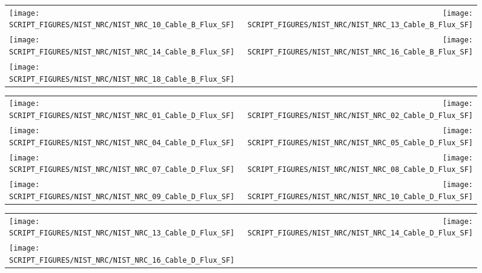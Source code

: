 \begin{figure}[!ht]
\begin{tabular*}{\textwidth}{l@{\extracolsep{\fill}}r}
\texttt{[image: SCRIPT\_FIGURES/NIST\_NRC/NIST\_NRC\_10\_Cable\_B\_Flux\_SF]} &
\texttt{[image: SCRIPT\_FIGURES/NIST\_NRC/NIST\_NRC\_13\_Cable\_B\_Flux\_SF]} \\
\texttt{[image: SCRIPT\_FIGURES/NIST\_NRC/NIST\_NRC\_14\_Cable\_B\_Flux\_SF]} &
\texttt{[image: SCRIPT\_FIGURES/NIST\_NRC/NIST\_NRC\_16\_Cable\_B\_Flux\_SF]} \\
\texttt{[image: SCRIPT\_FIGURES/NIST\_NRC/NIST\_NRC\_18\_Cable\_B\_Flux\_SF]}
\end{tabular*}
\end{figure}

\begin{figure}[!ht]
\begin{tabular*}{\textwidth}{l@{\extracolsep{\fill}}r}
\texttt{[image: SCRIPT\_FIGURES/NIST\_NRC/NIST\_NRC\_01\_Cable\_D\_Flux\_SF]} &
\texttt{[image: SCRIPT\_FIGURES/NIST\_NRC/NIST\_NRC\_02\_Cable\_D\_Flux\_SF]} \\
\texttt{[image: SCRIPT\_FIGURES/NIST\_NRC/NIST\_NRC\_04\_Cable\_D\_Flux\_SF]} &
\texttt{[image: SCRIPT\_FIGURES/NIST\_NRC/NIST\_NRC\_05\_Cable\_D\_Flux\_SF]} \\
\texttt{[image: SCRIPT\_FIGURES/NIST\_NRC/NIST\_NRC\_07\_Cable\_D\_Flux\_SF]} &
\texttt{[image: SCRIPT\_FIGURES/NIST\_NRC/NIST\_NRC\_08\_Cable\_D\_Flux\_SF]} \\
\texttt{[image: SCRIPT\_FIGURES/NIST\_NRC/NIST\_NRC\_09\_Cable\_D\_Flux\_SF]} &
\texttt{[image: SCRIPT\_FIGURES/NIST\_NRC/NIST\_NRC\_10\_Cable\_D\_Flux\_SF]}
\end{tabular*}
\end{figure}

\begin{figure}[!ht]
\begin{tabular*}{\textwidth}{l@{\extracolsep{\fill}}r}
\texttt{[image: SCRIPT\_FIGURES/NIST\_NRC/NIST\_NRC\_13\_Cable\_D\_Flux\_SF]} &
\texttt{[image: SCRIPT\_FIGURES/NIST\_NRC/NIST\_NRC\_14\_Cable\_D\_Flux\_SF]} \\
\texttt{[image: SCRIPT\_FIGURES/NIST\_NRC/NIST\_NRC\_16\_Cable\_D\_Flux\_SF]}
\end{tabular*}
\end{figure}


